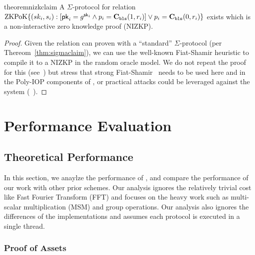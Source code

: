 
\begin{restatable}{theorem}{nizkclaim}
\label{thm:nizkclaim}
A $\Sigma$-protocol for relation $\mathrm{ZKPoK} \{ (sk_i,s_i) :  [\mathsf{pk}_i=g^{\mathsf{sk}_i} \land p_i=\textbf{C}_\texttt{bls}(1,r_i)  ] \lor p_i=\textbf{C}_\texttt{bls}(0,r_i) \}$ exists which is a non-interactive zero knowledge proof (NIZKP).
\end{restatable}

\begin{proof}
Given the relation can proven with a ``standard'' $\Sigma$-protocol (per Thereom~\ref{thm:sigmaclaim}), we can use the well-known Fiat-Shamir heuristic to compile it to a NIZKP in the random oracle model. We do not repeat the proof for this (see~\cite{damgard10,sigma}) but stress that strong Fiat-Shamir~\cite{weakfs} needs to be used here and in the Poly-IOP components of \Sys, or practical attacks could be leveraged against the system (\cf~\cite{weakfsattacks}).\end{proof}





\section{Performance Evaluation}

\subsection{Theoretical Performance}

In this section, we anaylze the performance of \Sys, and compare the performance of our work with other prior schemes. Our analysis ignores the relatively trivial cost like Fast Fourier Transform (FFT) and focuses on the heavy work such as multi-scalar multiplication (MSM) and group operations. Our analysis also ignores the differences of the implementations and assumes each protocol is executed in a single thread.
\subsubsection{Proof of Assets}

